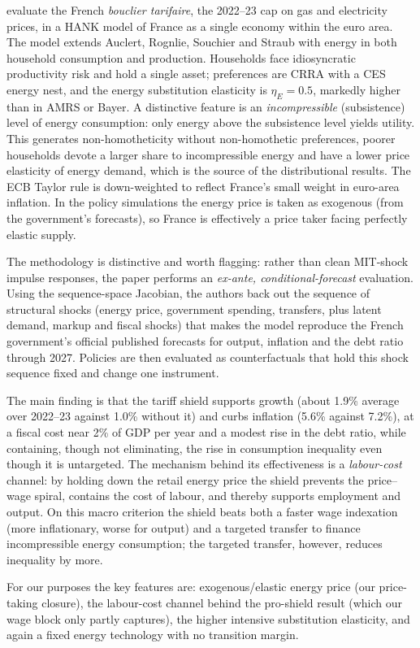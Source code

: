\citet{Langot2026} evaluate the French \emph{bouclier tarifaire}, the 2022--23
cap on gas and electricity prices, in a HANK model of France as a single
economy within the euro area. The model extends Auclert, Rognlie, Souchier and
Straub with energy in both household consumption and production. Households face
idiosyncratic productivity risk and hold a single asset; preferences are CRRA
with a CES energy nest, and the energy substitution elasticity is $\eta_E=0.5$,
markedly higher than in AMRS or Bayer. A distinctive feature is an
\emph{incompressible} (subsistence) level of energy consumption: only energy
above the subsistence level yields utility. This generates non-homotheticity
without non-homothetic preferences, poorer households devote a larger share to
incompressible energy and have a lower price elasticity of energy demand, which
is the source of the distributional results. The ECB Taylor rule is
down-weighted to reflect France's small weight in euro-area inflation. In the
policy simulations the energy price is taken as exogenous (from the
government's forecasts), so France is effectively a price taker facing
perfectly elastic supply.

The methodology is distinctive and worth flagging: rather than clean MIT-shock
impulse responses, the paper performs an \emph{ex-ante, conditional-forecast}
evaluation. Using the sequence-space Jacobian, the authors back out the
sequence of structural shocks (energy price, government spending, transfers,
plus latent demand, markup and fiscal shocks) that makes the model reproduce
the French government's official published forecasts for output, inflation and
the debt ratio through 2027. Policies are then evaluated as counterfactuals
that hold this shock sequence fixed and change one instrument.

The main finding is that the tariff shield supports growth (about 1.9\% average
over 2022--23 against 1.0\% without it) and curbs inflation (5.6\% against
7.2\%), at a fiscal cost near 2\% of GDP per year and a modest rise in the debt
ratio, while containing, though not eliminating, the rise in consumption
inequality even though it is untargeted. The mechanism behind its effectiveness
is a \emph{labour-cost} channel: by holding down the retail energy price the
shield prevents the price--wage spiral, contains the cost of labour, and
thereby supports employment and output. On this macro criterion the shield
beats both a faster wage indexation (more inflationary, worse for output) and a
targeted transfer to finance incompressible energy consumption; the targeted
transfer, however, reduces inequality by more.

For our purposes the key features are: exogenous/elastic energy price (our
price-taking closure), the labour-cost channel behind the pro-shield result
(which our wage block only partly captures), the higher intensive substitution
elasticity, and again a fixed energy technology with no transition margin.
